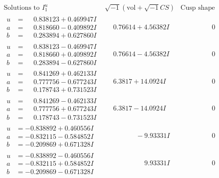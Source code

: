 \documentclass[1p]{elsarticle_modified}
\theoremstyle{definition}
\newcommand{\I}{\sqrt{-1}}
\begin{document}
$$\begin{array}{c|c|c}  
\text{Solutions to }I^u_{1}& \I (\text{vol} + \sqrt{-1}CS) & \text{Cusp shape}\\
 \hline 
\begin{aligned}
u &= \phantom{-}0.838123 + 0.469947 I \\
a &= \phantom{-}0.818660 - 0.409892 I \\
b &= \phantom{-}0.283894 + 0.627860 I\end{aligned}
 & \phantom{-}0.76614 + 4.56382 I & \phantom{-0.000000 } 0 \\ \hline\begin{aligned}
u &= \phantom{-}0.838123 - 0.469947 I \\
a &= \phantom{-}0.818660 + 0.409892 I \\
b &= \phantom{-}0.283894 - 0.627860 I\end{aligned}
 & \phantom{-}0.76614 - 4.56382 I & \phantom{-0.000000 } 0 \\ \hline\begin{aligned}
u &= \phantom{-}0.841269 + 0.462133 I \\
a &= \phantom{-}0.777756 - 0.677243 I \\
b &= \phantom{-}0.178743 + 0.731523 I\end{aligned}
 & \phantom{-}6.3817 + 14.0924 I & \phantom{-0.000000 } 0 \\ \hline\begin{aligned}
u &= \phantom{-}0.841269 - 0.462133 I \\
a &= \phantom{-}0.777756 + 0.677243 I \\
b &= \phantom{-}0.178743 - 0.731523 I\end{aligned}
 & \phantom{-}6.3817 - 14.0924 I & \phantom{-0.000000 } 0 \\ \hline\begin{aligned}
u &= -0.838892 + 0.460556 I \\
a &= -0.832115 - 0.584852 I \\
b &= -0.209869 + 0.671328 I\end{aligned}
 & \phantom{-0.000000 } -9.93331 I & \phantom{-0.000000 } 0 \\ \hline\begin{aligned}
u &= -0.838892 - 0.460556 I \\
a &= -0.832115 + 0.584852 I \\
b &= -0.209869 - 0.671328 I\end{aligned}
 & \phantom{-0.000000 -}9.93331 I & \phantom{-0.000000 } 0 \\ \hline\begin{aligned}

\end{aligned}
\end{array}$$
\end{document}
